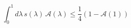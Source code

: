 \begin{equation}
\int_0^1 d\lambda\, s(\lambda) \, \mathcal{A}(\lambda) \leq \frac{1}{4}
(1-\mathcal{A}(1))
\end{equation}

